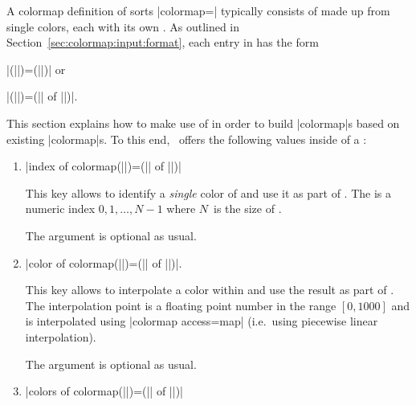 A colormap definition of sorts |colormap=| typically consists of  made up from single colors, each with its own . As outlined in Section~\ref{sec:colormap:input:format}, each entry in  has the form 

	|(||)=(||)| or

	|(||)=(|| of ||)|.

\noindent This section explains how to make use of  in order to build |colormap|s based on existing |colormap|s. To this end, \PGFPlots\ offers the following values inside of a :

\begin{enumerate}
	\item
	|index of colormap(||)=(|| of ||)|

	This key allows to identify a \emph{single} color of  and use it as part of . The  is a numeric index $0,1,\dotsc,N-1$ where $N$~is the size of .


	The  argument is optional as usual.
	
	\item
	|color of colormap(||)=(|| of ||)|.

	This key allows to interpolate a color within  and use the result as part of . The interpolation point is a floating point number in the range $[0,1000]$ and is interpolated using |colormap access=map| (i.e.\ using piecewise linear interpolation).

	The  argument is optional as usual.

	\item 
	|colors of colormap(||)=(|| of ||)|


\end{enumerate}
